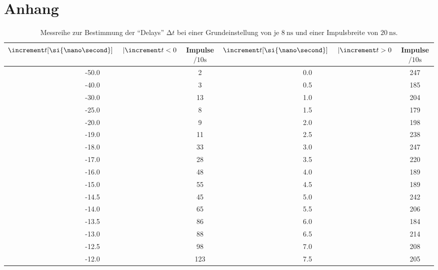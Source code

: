\section{Anhang}

\begin{table}
    \centering
    \caption{Messreihe zur Bestimmung der \enquote{Delays} $\increment t$ bei einer Grundeinstellung von je $\SI{8}{\nano\second}$ und einer Impulsbreite von $\SI{20}{\nano\second}$. } 
    \label{tab:MessreiheDelay20ns}
    \begin{tabular}{c c || c c}
        \toprule
        $\increment t [\si{\nano\second}] \hspace{0.5cm}| \increment t < 0 $ & Impulse $\si{\per{10}\second} $ & $\increment t [\si{\nano\second}] \hspace{0.5cm}|\increment t > 0 $ & Impulse $\si{\per{10}\second}$ \\
        \midrule
            -50.0    &      2     &   0.0       &     247   \\               
            -40.0    &      3     &   0.5     &     185   \\ 
            -30.0    &      13    &   1.0       &     204   \\     
            -25.0    &      8     &   1.5     &     179   \\ 
            -20.0    &      9     &   2.0       &     198   \\     
            -19.0    &      11    &   2.5     &     238   \\  
            -18.0    &      33    &   3.0       &     247   \\     
            -17.0    &      28    &   3.5     &     220   \\  
            -16.0    &      48    &   4.0       &     189   \\     
            -15.0    &      55    &   4.5     &     189   \\     
            -14.5  &      45    &   5.0       &     242   \\     
            -14.0    &      65    &   5.5     &     206   \\  
            -13.5  &      86    &   6.0       &     184   \\     
            -13.0    &      88    &   6.5     &     214   \\  
            -12.5  &      98    &   7.0       &     208   \\     
            -12.0    &      123   &   7.5     &     205   \\   

\end{tabular}
\end{table}
